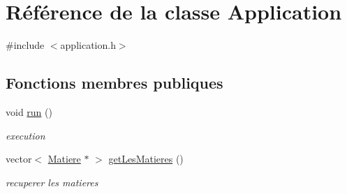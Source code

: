 \hypertarget{class_application}{\section{Référence de la classe Application}
\label{class_application}
}


{\ttfamily \#include $<$application.\+h$>$}

\subsection*{Fonctions membres publiques}
\begin{DoxyCompactItemize}
\item 
void \hyperlink{class_application_a68965449404743bf1add056784d6cf81}{run} ()
\begin{DoxyCompactList}\small\item\em execution \end{DoxyCompactList}\item 
vector$<$ \hyperlink{class_matiere}{Matiere} $\ast$ $>$ \hyperlink{class_application_a0e74957eda5f689046bf6674a9795468}{get\+Les\+Matieres} ()
\begin{DoxyCompactList}\small\item\em recuperer les matieres \end{DoxyCompactList}\end{DoxyCompactItemize}
